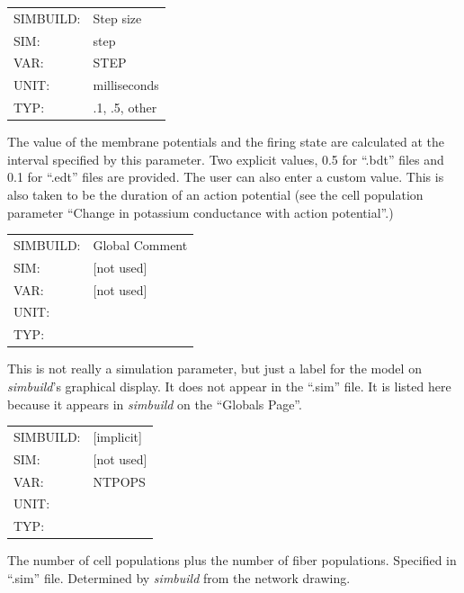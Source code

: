 \documentclass[12pt,openany,oneside]{book}
\newcommand{\prog}[1]{\textit{{#1}}}
\newcommand{\ext}[1]{{{``.#1''}}}
\newcommand{\inquotes}[1]{{{``#1''}}}
\begin{document}
\begin{flushleft}
\begin{tabular}{@{}ll@{}}
\label{Simulation step size in milliseconds}
SIMBUILD: & Step size\\
SIM: & step\\
VAR: & STEP\\
UNIT: & milliseconds\\
TYP: & .1, .5, other\\
\end{tabular}
\end{flushleft}
\noindent
The value of the membrane potentials and the firing state are
calculated at the interval specified by this parameter. Two explicit 
values, 0.5 for \ext{bdt} files and 0.1 for \ext{edt} files are provided. The
user can also enter a custom value. This is also
taken to be the duration of an action potential (see the cell
population parameter \inquotes{Change in potassium conductance with action
potential}.)  
\filbreak
\vspace{\baselineskip}

\begin{flushleft}
\begin{tabular}{@{}ll@{}}
SIMBUILD: & Global Comment\\
SIM: & [not used]\\
VAR: & [not used]\\
UNIT: &\\
TYP: &\\
\end{tabular}
\end{flushleft}
\noindent
This is not really a simulation parameter, but just a label for the
model on \prog{simbuild}'s graphical display. It does not appear in the
\ext{sim} file. It is listed here because it appears in \prog{simbuild} on the
\inquotes{Globals Page}.
\filbreak
\vspace{\baselineskip}

\begin{flushleft}
\begin{tabular}{@{}ll@{}}
SIMBUILD: & [implicit]\\
SIM: & [not used]\\
VAR: & NTPOPS\\
UNIT: &\\
TYP: &\\
\end{tabular}
\end{flushleft}
\noindent
The number of cell populations plus the number of fiber populations.
Specified in \ext{sim} file. Determined by \prog{simbuild} from the network
drawing.
\filbreak
\vspace{\baselineskip}
\end{document}
